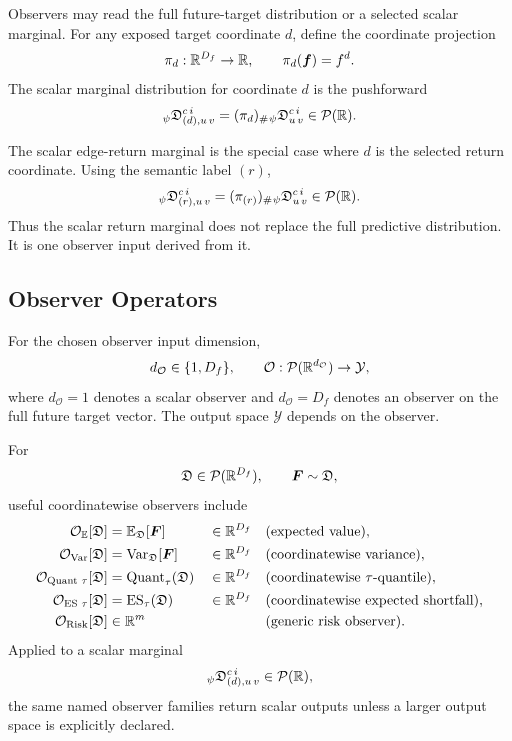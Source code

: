 Observers may read the full future-target distribution or a selected scalar
marginal.  For any exposed target coordinate $d$, define the coordinate
projection
\[
  \pi_d:\mathbb{R}^{D_f}\rightarrow\mathbb{R},
  \qquad
  \pi_d(\bm{f}) = f^d.
\]
The scalar marginal distribution for coordinate $d$ is the pushforward
\[
  {}_{\psi}\mathfrak{D}_{(d),u\,v}^{c\,i}
  =
  (\pi_d)_{\#}
  {}_{\psi}\mathfrak{D}_{u\,v}^{c\,i}
  \in
  \mathcal{P}(\mathbb{R}).
\]

The scalar edge-return marginal is the special case where $d$ is the selected
return coordinate.  Using the semantic label $(r)$,
\[
  {}_{\psi}\mathfrak{D}_{(r),u\,v}^{c\,i}
  =
  (\pi_{(r)})_{\#}
  {}_{\psi}\mathfrak{D}_{u\,v}^{c\,i}
  \in
  \mathcal{P}(\mathbb{R}).
\]
Thus the scalar return marginal does not replace the full predictive
distribution.  It is one observer input derived from it.

\subsection{Observer Operators}
\label{subsec:observer-operators}

For the chosen observer input dimension,
\[
  d_{\mathcal{O}}\in\{1,D_f\},
  \qquad
  \mathcal{O}
  :
  \mathcal{P}(\mathbb{R}^{d_{\mathcal{O}}})
  \rightarrow
  \mathcal{Y},
\]
where $d_{\mathcal{O}}=1$ denotes a scalar observer and
$d_{\mathcal{O}}=D_f$ denotes an observer on the full future target vector.
The output space $\mathcal{Y}$ depends on the observer.

For
\[
  \mathfrak{D}\in\mathcal{P}(\mathbb{R}^{D_f}),
  \qquad
  \bm{F}\sim\mathfrak{D},
\]
useful coordinatewise observers include
\begin{align*}
  \mathcal{O}_{\mathbb{E}}[\mathfrak{D}]
    &=
    \mathbb{E}_{\mathfrak{D}}[\bm{F}]
    &&\in\mathbb{R}^{D_f}
    &&\text{(expected value)},\\
  \mathcal{O}_{\operatorname{Var}}[\mathfrak{D}]
    &=
    \operatorname{Var}_{\mathfrak{D}}[\bm{F}]
    &&\in\mathbb{R}^{D_f}
    &&\text{(coordinatewise variance)},\\
  \mathcal{O}_{\operatorname{Quant}\,\tau}[\mathfrak{D}]
    &=
    \operatorname{Quant}_{\tau}(\mathfrak{D})
    &&\in\mathbb{R}^{D_f}
    &&\text{(coordinatewise $\tau$-quantile)},\\
  \mathcal{O}_{\operatorname{ES}\,\tau}[\mathfrak{D}]
    &=
    \operatorname{ES}_{\tau}(\mathfrak{D})
    &&\in\mathbb{R}^{D_f}
    &&\text{(coordinatewise expected shortfall)},\\
  \mathcal{O}_{\operatorname{Risk}}[\mathfrak{D}]
    &\in \mathbb{R}^m
    &&
    &&\text{(generic risk observer)}.
\end{align*}
Applied to a scalar marginal
\[
  {}_{\psi}\mathfrak{D}_{(d),u\,v}^{c\,i}
  \in
  \mathcal{P}(\mathbb{R}),
\]
the same named observer families return scalar outputs unless a larger output
space is explicitly declared.

